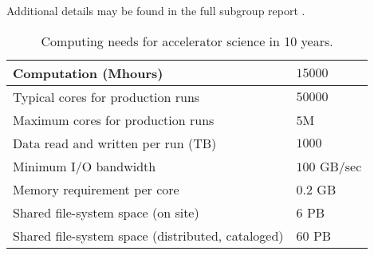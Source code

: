 Additional details may be found in the full subgroup report \cite{Spentzouris:2013jla}.


\begin{table}[t]
\begin{center}
\caption{Computing needs for accelerator science in 10 years.}
\begin{tabular}{|l|l|} 
 \hline 
 Computation (Mhours) & $15000$ \\ \hline
 Typical cores for production runs & $50000$ \\ \hline
 Maximum cores for production runs & $5$M\\ \hline
 Data read and written per run (TB) & $1000$\\ \hline
 Minimum I/O bandwidth & $100$ GB/sec\\ \hline
 Memory requirement per core & $0.2$ GB \\ \hline
Shared file-system space (on site) & $6$ PB\\ \hline
Shared file-system space (distributed, cataloged) & $60$ PB\\ \hline
\end{tabular}
\label{tab:CompNeeds}
\end{center}
\end{table}
